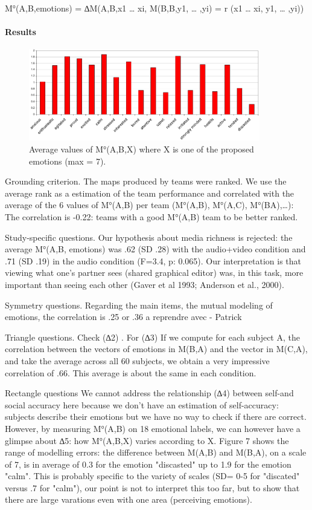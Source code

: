 \documentclass[twocolumn]{article}
\begin{document}
M°(A,B,emotions) = ∆M(A,B,{x1 … xi}, M(B,B,{y1, … ,yi}) = r ({x1 … xi}, {y1, …
,yi}))

\paragraph{Results}

\begin{figure}[ht!]
        \centering
        \includegraphics[width=0.9\textwidth]{image9.pdf}
        \caption{Average values of M°(A,B,X) where X is one of the proposed
        emotions (max = 7).}
        \label{study3:deg_m_values}
\end{figure}

Grounding criterion. The maps produced by teams were ranked. We use the average
rank as a estimation of the team performance and correlated with the average of
the 6 values of M°(A,B) per team (M°(A,B), M°(A,C), M°(BA),…): The correlation
is -0.22: teams with a good M°(A,B) team to be better ranked. 

Study-specific questions. Our hypothesis about media richness is rejected: the
average M°(A,B, emotions) was .62 (SD .28) with the audio+video condition and
.71 (SD .19) in the audio condition (F=3.4, p: 0.065). Our interpretation is
that viewing what one's partner sees (shared graphical editor) was, in this
task, more important than seeing each other (Gaver et al 1993; Anderson et al.,
2000).  

Symmetry questions. Regarding the main items, the mutual modeling of emotions,
the correlation is .25 or .36  a reprendre avec - Patrick 

Triangle questions. Check (∆2) . For (∆3) If we compute for each subject A, the
correlation between the vectors of emotions in M(B,A) and the vector in M(C,A),
and take the average across all 60 subjects, we obtain a very impressive
correlation of .66. This average is about the same in each condition.

Rectangle questions We cannot address the relationship (∆4) between self-and
social accuracy here because we don't have an estimation of self-accuracy:
subjects describe their emotions but we have no way to check if there are
correct. However, by measuring M°(A,B) on  18 emotional labels, we can however
have a glimpse about ∆5: how M°(A,B,X) varies according to X. Figure 7 shows the
range of modelling errors: the difference between M(A,B) and M(B,A), on a scale
of 7, is in average of 0.3 for the emotion "discasted" up to 1.9 for the emotion
"calm". This is probably specific to the variety of scales  (SD= 0-5 for
"discated" versus .7 for "calm"), our point is not to interpret this too far,
but to show that there are large varations even with one area  (perceiving
emotions). 
\end{document}
